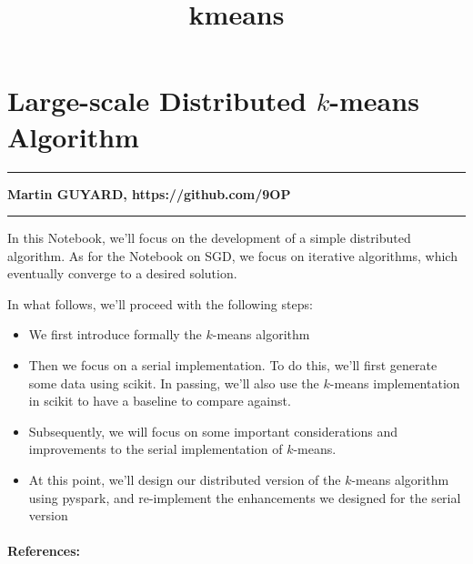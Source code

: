 \documentclass[11pt]{article}
\title{kmeans}
\providecommand{\tightlist}{%
      \setlength{\itemsep}{0pt}\setlength{\parskip}{0pt}}
\begin{document}
    
    
    \maketitle
    
    

    
    \hypertarget{large-scale-distributed-k-means-algorithm}{%
\section{\texorpdfstring{Large-scale Distributed \(k\)-means
Algorithm}{Large-scale Distributed k-means Algorithm}}\label{large-scale-distributed-k-means-algorithm}}

\begin{center}\rule{0.5\linewidth}{\linethickness}\end{center}

\textbf{Martin GUYARD, https://github.com/9OP}

\begin{center}\rule{0.5\linewidth}{\linethickness}\end{center}

In this Notebook, we'll focus on the development of a simple distributed
algorithm. As for the Notebook on SGD, we focus on iterative algorithms,
which eventually converge to a desired solution.

In what follows, we'll proceed with the following steps:

\begin{itemize}
\tightlist
\item
  We first introduce formally the \(k\)-means algorithm
\item
  Then we focus on a serial implementation. To do this, we'll first
  generate some data using scikit. In passing, we'll also use the
  \(k\)-means implementation in scikit to have a baseline to compare
  against.
\item
  Subsequently, we will focus on some important considerations and
  improvements to the serial implementation of \(k\)-means.
\item
  At this point, we'll design our distributed version of the \(k\)-means
  algorithm using pyspark, and re-implement the enhancements we designed
  for the serial version
\end{itemize}

\hypertarget{references}{%
\paragraph{References:}\label{references}}
\end{document}
